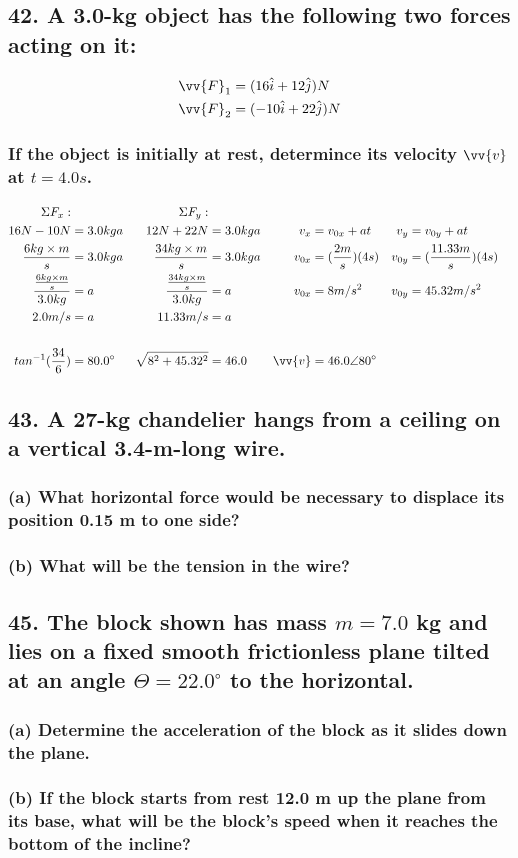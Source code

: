\documentclass[12pt,a4paper,english]{article}
\begin{document}
\begin{flushleft}
  \subsection{42. A 3.0-kg object has the following two forces acting on it:}
  \begin{align*}
    \vv{F}_1&=(16\hat{i}+12\hat{j})N\\
    \vv{F}_2&=(-10\hat{i}+22\hat{j})N
  \end{align*}
  \subsubsection{If the object is initially at rest, determince its velocity $\vv{v}$ at $t=4.0s$.}
  \begin{align*}
    \Sigma F_x:&  &   \Sigma F_y:&\\
    16N-10N&=3.0kga 
       & 12N+22N&=3.0kga
       &v_x&=v_{0x}+at
       &v_y&=v_{0y}+at
       \\
    \frac{6kg\times m}{s}&=3.0kga
       &\frac{34kg\times m}{s}&=3.0kga
       &v_{0x}&=(\frac{2m}{s})(4s)
       &v_{0y}&=(\frac{11.33m}{s})(4s)
       \\
    \frac{\frac{6kg\times m}{s}}{3.0kg}&=a
       &\frac{\frac{34kg\times m}{s}}{3.0kg}&=a
       &v_{0x}&=8m/s^2
       &v_{0y}&=45.32m/s^2
       \\
    2.0m/s&=a
       &11.33m/s&=a
       \\
       \\
    tan^{-1}(\frac{34}{6})&=80.0^\circ 
       &\sqrt{8^2+45.32^2}&=46.0
       &\vv{v}&=46.0\angle 80^\circ
  \end{align*}
  \subsection{43. A 27-kg chandelier hangs from a ceiling on a vertical 3.4-m-long wire.}
  \subsubsection{(a) What horizontal force would be necessary to displace its position 0.15 m to one side?}
  \subsubsection{(b) What will be the tension in the wire?}
  \subsection{45. The block shown has mass $m=7.0$ kg and lies on a fixed smooth frictionless plane tilted at an angle $\Theta=22.0^\circ$ to the horizontal.}
  \subsubsection{(a) Determine the acceleration of the block as it slides down the plane.}
  \subsubsection{(b) If the block starts from rest 12.0 m up the plane from its base, what will be the block's speed when it reaches the bottom of the incline?}
\end{flushleft}
\end{document}
